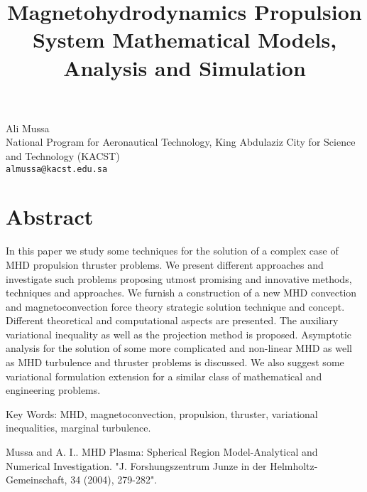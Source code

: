 \title{Magnetohydrodynamics Propulsion System Mathematical Models, Analysis and Simulation}
 \author{} \institute{}
\maketitle
\begin{center}
{\large Ali  Mussa}\\
National Program for Aeronautical Technology, King Abdulaziz City for Science and Technology (KACST)\\
{\tt almussa@kacst.edu.sa}

\end{center}

\section*{Abstract}

In this paper we study some techniques for the solution of a complex case of MHD propulsion thruster problems. We present different approaches and investigate such problems proposing utmost promising and innovative methods, techniques and approaches. We furnish a construction of a new MHD convection and magnetoconvection force theory strategic solution technique and concept. Different theoretical and computational aspects are presented. The auxiliary variational inequality as well as the projection method is proposed. Asymptotic analysis for the solution of some more complicated and non-linear MHD as well as MHD turbulence and thruster problems is discussed. We also suggest some variational formulation extension for a similar class of mathematical and engineering problems.


Key Words:  MHD, magnetoconvection, propulsion, thruster, variational inequalities, marginal turbulence.




\begin{thebibliography}{10}

{\sc  Mussa and A. I.}. {MHD Plasma: Spherical Region Model-Analytical and Numerical Investigation}. "J. Forshungszentrum Junze in der Helmholtz-Gemeinschaft,  34 (2004), 279-282".

\end{thebibliography}
